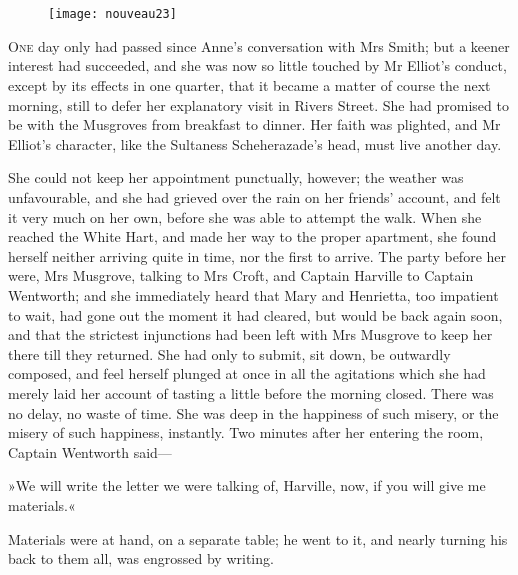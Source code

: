 \chapter[Chapter \thechapter]{}

\begin{figure}[t!]
\centering
\texttt{[image: nouveau23]}
\end{figure}

\lettrine[lines=4,lraise=0.3]{O}{ne} day only had passed since Anne's conversation with Mrs Smith; but a keener interest had succeeded, and she was now so little touched by Mr Elliot's conduct, except by its effects in one quarter, that it became a matter of course the next morning, still to defer her explanatory visit in Rivers Street. She had promised to be with the Musgroves from breakfast to dinner. Her faith was plighted, and Mr Elliot's character, like the Sultaness Scheherazade's head, must live another day.

She could not keep her appointment punctually, however; the weather was unfavourable, and she had grieved over the rain on her friends' account, and felt it very much on her own, before she was able to attempt the walk. When she reached the White Hart, and made her way to the proper apartment, she found herself neither arriving quite in time, nor the first to arrive. The party before her were, Mrs Musgrove, talking to Mrs Croft, and Captain Harville to Captain Wentworth; and she immediately heard that Mary and Henrietta, too impatient to wait, had gone out the moment it had cleared, but would be back again soon, and that the strictest injunctions had been left with Mrs Musgrove to keep her there till they returned. She had only to submit, sit down, be outwardly composed, and feel herself plunged at once in all the agitations which she had merely laid her account of tasting a little before the morning closed. There was no delay, no waste of time. She was deep in the happiness of such misery, or the misery of such happiness, instantly. Two minutes after her entering the room, Captain Wentworth said—

»We will write the letter we were talking of, Harville, now, if you will give me materials.«

Materials were at hand, on a separate table; he went to it, and nearly turning his back to them all, was engrossed by writing.

